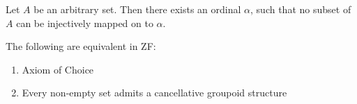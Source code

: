 \documentclass[../../main.tex]{subfiles}
\begin{document}
\begin{lemma}\cite{Har15}
    Let $A$ be an arbitrary set.
    Then there exists an ordinal $\alpha$, such that no subset of $A$ can be injectively mapped on to $\alpha$.
\end{lemma}

\begin{theorem}\cite{Haj72}
    The following are equivalent in ZF:
    \begin{enumerate}
        \item Axiom of Choice
        \item Every non-empty set admits a cancellative groupoid structure
    \end{enumerate}
\end{theorem}
\end{document}
